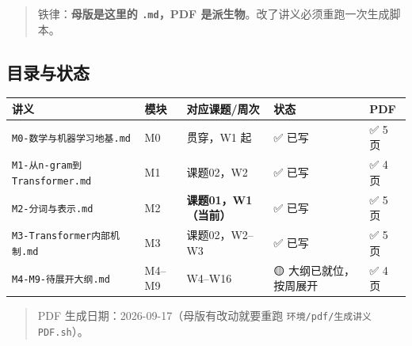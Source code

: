 \documentclass[
  chinese,
  11pt,
]{ctexart}
\newcounter{none} %
\begin{document}
\begin{quote}
铁律：\textbf{母版是这里的 \texttt{.md}，PDF 是派生物}。改了讲义必须重跑一次生成脚本。
\end{quote}

\subsection{目录与状态}\label{ux76eeux5f55ux4e0eux72b6ux6001}

{\def\LTcaptype{none} %
\begin{longtable}[]{@{}
  >{\raggedright\arraybackslash}p{}
  >{\raggedright\arraybackslash}p{}
  >{\raggedright\arraybackslash}p{}
  >{\raggedright\arraybackslash}p{}
  >{\raggedright\arraybackslash}p{}@{}}
\toprule\noalign{}
\begin{minipage}[b]{\linewidth}\raggedright
讲义
\end{minipage} & \begin{minipage}[b]{\linewidth}\raggedright
模块
\end{minipage} & \begin{minipage}[b]{\linewidth}\raggedright
对应课题/周次
\end{minipage} & \begin{minipage}[b]{\linewidth}\raggedright
状态
\end{minipage} & \begin{minipage}[b]{\linewidth}\raggedright
PDF
\end{minipage} \\
\midrule\noalign{}
\endhead
\bottomrule\noalign{}
\endlastfoot
\texttt{M0-数学与机器学习地基.md} & M0 & 贯穿，W1 起 & ✅ 已写 & ✅ 5 页 \\
\texttt{M1-从n-gram到Transformer.md} & M1 & 课题02，W2 & ✅ 已写 & ✅ 4 页 \\
\texttt{M2-分词与表示.md} & M2 & \textbf{课题01，W1（当前）} & ✅ 已写 & ✅ 5 页 \\
\texttt{M3-Transformer内部机制.md} & M3 & 课题02，W2--W3 & ✅ 已写 & ✅ 5 页 \\
\texttt{M4-M9-待展开大纲.md} & M4--M9 & W4--W16 & 🟡 大纲已就位，按周展开 & ✅ 4 页 \\
\end{longtable}
}

\begin{quote}
PDF 生成日期：2026-09-17（母版有改动就要重跑 \texttt{环境/pdf/生成讲义PDF.sh}）。
\end{quote}
\end{document}
